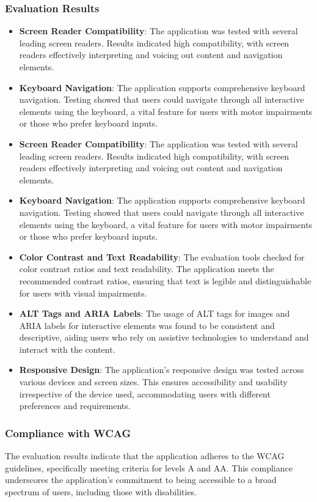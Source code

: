 \subsubsection{Evaluation Results}
\begin{itemize}
  \item \textbf{Screen Reader Compatibility}: The application was tested with several leading screen readers. Results indicated high compatibility, with screen readers effectively interpreting and voicing out content and navigation elements.
  \item \textbf{Keyboard Navigation}: The application supports comprehensive keyboard navigation. Testing showed that users could navigate through all interactive elements using the keyboard, a vital feature for users with motor impairments or those who prefer keyboard inputs.
  \item \textbf{Screen Reader Compatibility}: The application was tested with several leading screen readers. Results indicated high compatibility, with screen readers effectively interpreting and voicing out content and navigation elements.
  \item \textbf{Keyboard Navigation}: The application supports comprehensive keyboard navigation. Testing showed that users could navigate through all interactive elements using the keyboard, a vital feature for users with motor impairments or those who prefer keyboard inputs.
  \item \textbf{Color Contrast and Text Readability}: The evaluation tools checked for color contrast ratios and text readability. The application meets the recommended contrast ratios, ensuring that text is legible and distinguishable for users with visual impairments.
  \item \textbf{ALT Tags and ARIA Labels}: The usage of ALT tags for images and ARIA labels for interactive elements was found to be consistent and descriptive, aiding users who rely on assistive technologies to understand and interact with the content.
  \item \textbf{Responsive Design}: The application's responsive design was tested across various devices and screen sizes. This ensures accessibility and usability irrespective of the device used, accommodating users with different preferences and requirements.
\end{itemize}

\subsubsection{Compliance with WCAG}
The evaluation results indicate that the application adheres to the WCAG guidelines, specifically meeting criteria for levels A and AA. This compliance underscores the application's commitment to being accessible to a broad spectrum of users, including those with disabilities.

